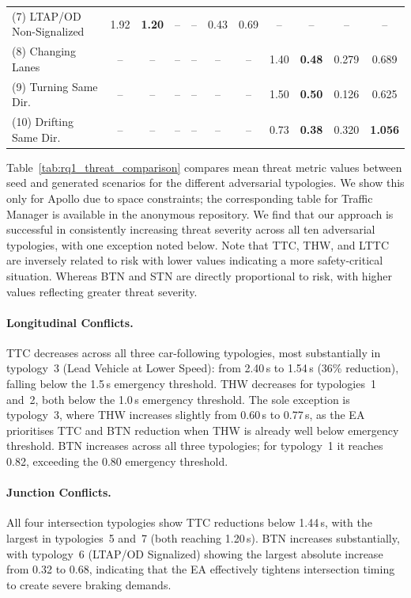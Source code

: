 \begin{table}[t]
\begin{tabular}{@{}l cc cc cc cc cc@{}}
\rowcolor{green!5}
(7) LTAP/OD Non-Signalized    & 1.92 & \textbf{1.20} & -- & -- & 0.43 & 0.69 & -- & -- & -- & -- \\
\rowcolor{orange!5}
(8) Changing Lanes             & -- & -- & -- & -- & -- & -- & 1.40 & \textbf{0.48} & 0.279 & 0.689 \\
\rowcolor{orange!5}
(9) Turning Same Dir.          & -- & -- & -- & -- & -- & -- & 1.50 & \textbf{0.50} & 0.126 & 0.625 \\
\rowcolor{orange!5}
(10) Drifting Same Dir.        & -- & -- & -- & -- & -- & -- & 0.73 & \textbf{0.38} & 0.320 & \textbf{1.056} \\
\bottomrule
\end{tabular}
\end{table}

Table~\ref{tab:rq1_threat_comparison} compares mean threat metric values between seed and generated scenarios for the different adversarial typologies. We show this only for Apollo due to space constraints; the corresponding table for Traffic Manager is available in the anonymous repository.  We find that our approach is successful in consistently increasing threat severity across all ten adversarial typologies, with one exception noted below. Note that TTC, THW, and LTTC are inversely related to risk with lower values indicating a more safety-critical situation.  Whereas BTN and STN are directly proportional to risk, with higher values reflecting greater threat severity. 

\paragraph{Longitudinal Conflicts.}
TTC decreases across all three car-following typologies, most substantially in typology~3 (Lead Vehicle at Lower Speed): from 2.40\,s to 1.54\,s (36\% reduction), falling below the 1.5\,s emergency threshold. THW decreases for typologies~1 and~2, both below the 1.0\,s emergency threshold. The sole exception is typology~3, where THW increases slightly from 0.60\,s to 0.77\,s, as the EA prioritises TTC and BTN reduction when THW is already well below emergency threshold. BTN increases across all three typologies; for typology~1 it reaches 0.82, exceeding the 0.80 emergency threshold.

\paragraph{Junction Conflicts.}
All four intersection typologies show TTC reductions below 1.44\,s, with the largest in typologies~5 and~7 (both reaching 1.20\,s). BTN increases substantially, with typology~6 (LTAP/OD Signalized) showing the largest absolute increase from 0.32 to 0.68, indicating that the EA effectively tightens intersection timing to create severe braking demands.

